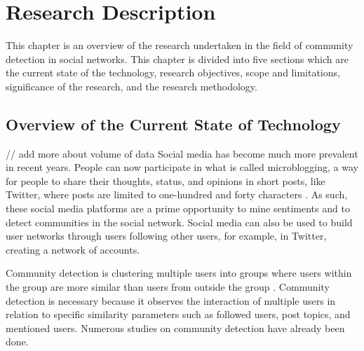 %
%
%                 


\chapter{Research Description}
\label{sec:researchdesc}


This chapter is an overview of the research undertaken in the field of community detection in social networks. 
This chapter is divided into five sections which are the current state of the technology, research objectives, scope and limitations, significance of the research, and the research methodology.


\section{Overview of the Current State of Technology}
\label{sec:overview}

// add more about volume of data
Social media has become much more prevalent in recent years. People can now participate in what is called microblogging, a way for people to share their thoughts, status, and opinions in short posts, like Twitter, where posts are limited to one-hundred and forty characters \cite{Java:2007}. As such, these social media platforms are a prime opportunity to mine sentiments and to detect communities in the social network. Social media can also be used to build user networks through users following other users, for example, in Twitter, creating a network of accounts.


Community detection is clustering multiple users into groups where users within the group are more similar than users from outside the group \cite{Tang:2010}. Community detection is necessary because it observes the interaction of multiple users in relation to specific similarity parameters such as followed users, post topics, and mentioned users. Numerous studies on community detection have already been done. 

